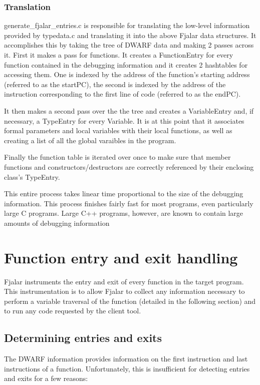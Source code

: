 \documentclass[11pt]{report}
\begin{document}
\subsubsection{Translation}
generate\_fjalar\_entries.c is responsible for translating the low-level
information provided by typedata.c and translating it into the above
Fjalar data structures. It accomplishes this by taking the tree of
DWARF data and making 2 passes across it. First it makes a pass
for functions. It creates a FunctionEntry for every function contained
in the debugging information and it creates 2 hashtables for accessing
them. One is indexed by the address of the function's starting
address (referred to as the startPC), the second is indexed by the
address of the instruction corresponding to the first line of code
(referred to as the endPC). 

It then makes a second pass over the the tree and creates a 
VariableEntry and, if necessary, a TypeEntry for every Variable. It is
at this point that it associates formal parameters and local variables
with their local functions, as well as creating a list of all the
global varaibles in the program.

Finally the function table is iterated over once to make sure that
member functions and constructors/destructors are correctly referenced
by their enclosing class's TypeEntry.

This entire process takes linear time proportional to the size of the
debugging information. This process finishes fairly fast for most
programs, even particularly large C programs. Large C++ programs,
however, are known to contain large amounts of debugging information





\section{Function entry and exit handling}
Fjalar instruments the entry and exit of every function in the target
program. This instrumentation is to allow Fjalar to collect any
information necessary to perform a variable traversal of the function
(detailed in the following section) and to run any code requested by
the client tool.

\subsection{Determining entries and exits}
The DWARF information provides information on the first
instruction and last instructions of a function. Unfortunately, this
is insufficient for detecting entries and exits for a few reasons:
\end{document}
